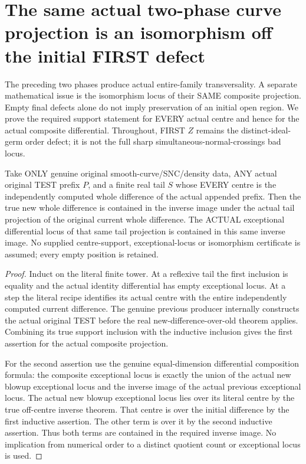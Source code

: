 \section{The same actual two-phase curve projection is an isomorphism off the initial FIRST defect}

The preceding two phases produce actual entire-family transversality.
A separate mathematical issue is the isomorphism locus of their SAME
composite projection. Empty final defects alone do not imply preservation
of an initial open region. We prove the required support statement for
EVERY actual centre and hence for the actual composite differential.
Throughout, FIRST $Z$ remains the distinct-ideal-germ order defect;
it is not the full sharp simultaneous-normal-crossings bad locus.

\begin{lemma}
\label{hir:sharp-actual-curve-difference-tail-exceptional-support}
\leanok
Take ONLY genuine original smooth-curve/SNC/density data, ANY actual
original TEST prefix $P$, and a finite real tail $S$ whose EVERY centre
is the independently computed whole difference of the actual appended
prefix. Then the true new whole difference is contained in the inverse
image under the actual tail projection of the original current
whole difference. The ACTUAL exceptional differential locus of that
same tail projection is contained in this same inverse image.
No supplied centre-support, exceptional-locus or isomorphism certificate
is assumed; every empty position is retained.
\end{lemma}
\begin{proof}
Induct on the literal finite tower. At a reflexive tail the first
inclusion is equality and the actual identity differential has empty
exceptional locus. At a step the literal recipe identifies its actual
centre with the entire independently computed current difference.
The genuine previous producer internally constructs the actual
original TEST before the real new-difference-over-old theorem applies.
Combining its true support inclusion with the inductive inclusion gives
the first assertion for the actual composite projection.

For the second assertion use the genuine equal-dimension differential
composition formula: the composite exceptional locus is exactly the
union of the actual new blowup exceptional locus and the inverse image
of the actual previous exceptional locus. The actual new blowup
exceptional locus lies over its literal centre by the true off-centre
inverse theorem. That centre is over the initial difference by the
first inductive assertion. The other term is over it by the second
inductive assertion. Thus both terms are contained in the required
inverse image. No implication from numerical order to a distinct
quotient count or exceptional locus is used.
\end{proof}

